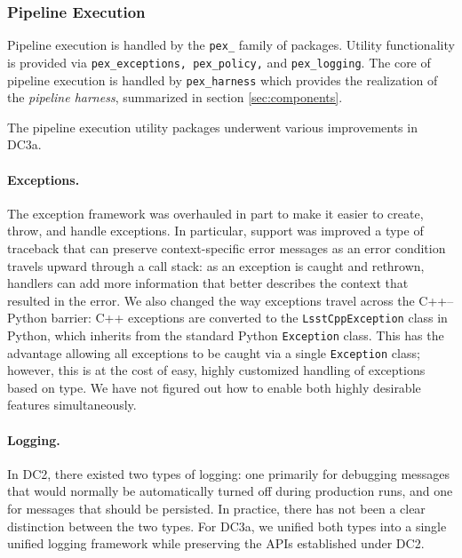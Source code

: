 
\subsubsection{Pipeline Execution} \label{sec:pex}

Pipeline execution is handled by the {\tt pex\_} family of packages.
Utility functionality is provided via {\tt pex\_exceptions,
pex\_policy,} and {\tt pex\_logging}.  The core of pipeline execution
is handled by {\tt pex\_harness} which provides the realization of the
{\it pipeline harness}, summarized in section \ref{sec:components}.


The pipeline execution utility packages underwent various
improvements in DC3a.

\paragraph{Exceptions.}  The exception framework was overhauled in
part to make it easier to create, throw, and handle exceptions.  In
particular, support was improved a type of traceback that can preserve
context-specific error messages as an error condition travels upward
through a call stack: as an exception is caught and rethrown, handlers
can add more information that better describes the context that
resulted in the error.  We also changed the way exceptions travel
across the C++--Python barrier: C++ exceptions are converted to the
{\tt LsstCppException} class in Python, which inherits from the
standard Python {\tt Exception} class.  This has the advantage
allowing all exceptions to be caught via a single {\tt Exception}
class; however, this is at the cost of easy, highly customized
handling of exceptions based on type.  We have not figured out how
to enable both highly desirable features simultaneously.  

\paragraph{Logging.}  In DC2, there existed two types of logging:  one
primarily for debugging messages that would normally be automatically
turned off during production runs, and one for messages that should be
persisted.  In practice, there has not been a clear distinction
between the two types.  For DC3a, we unified both types into a single
unified logging framework while preserving the APIs established under
DC2.  

